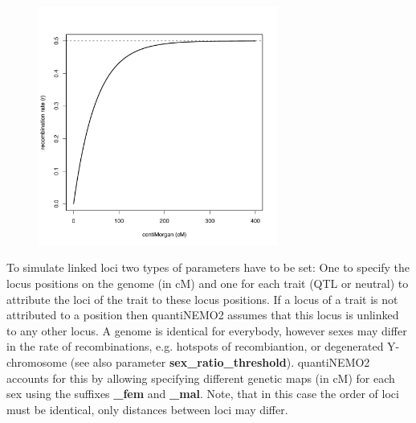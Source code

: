 \documentclass[letterpaper,12pt,oneside]{book}
\begin{document}
\begin{figure}[h]
	\centering
		\includegraphics[width=0.70\textwidth]{cM2r.pdf}
	\label{fig:centiMorgan to recombination rate}
\end{figure}



To simulate linked loci two types of parameters have to be set: One to specify the locus positions on the genome (in cM) and one for each trait (QTL or neutral) to attribute the loci of the trait to these locus positions. If a locus of a trait is not attributed to a position then quantiNEMO2 assumes that this locus is unlinked to any other locus. A genome is identical for everybody, however sexes may differ in the rate of recombinations, e.g. hotspots of recombiantion, or degenerated Y-chromosome (see also parameter \textbf{sex\_ratio\_threshold}). quantiNEMO2 accounts for this by allowing specifying different genetic maps (in cM) for each sex using the suffixes \textbf{\_fem} and \textbf{\_mal}. Note, that in this case the order of loci must be identical, only distances between loci may differ.
\end{document}
